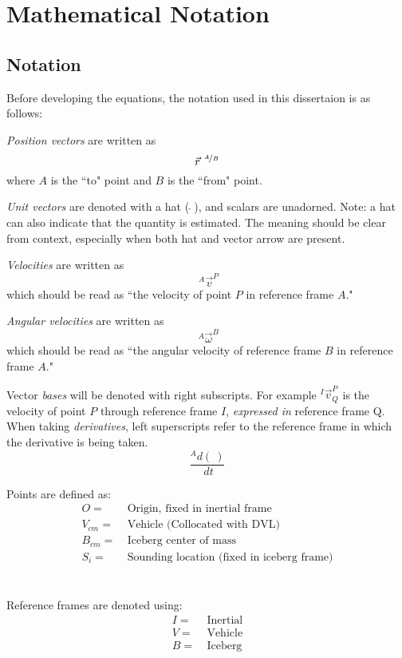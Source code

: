 
\chapter{Mathematical Notation}
\label{ch.Notation}
\section{Notation}

Before developing the equations, the notation used in this dissertaion is as follows:

\emph{Position vectors} are written as
\begin{equation*}
 \vec{r}^{~\nicefrac{A}{B}} 
\end{equation*}
where $A$ is the ``to" point and $B$ is the ``from" point.

\emph{Unit vectors} are denoted with a hat ($~\hat{}~$), and scalars are unadorned. Note: a hat can also indicate that the quantity is estimated. The meaning should be clear from context, especially when both hat and vector arrow are present.

\emph{Velocities} are written as 
\begin{equation*} 
~^{A}\vec{v}^{P} 
\end{equation*}
which should be read as ``the velocity of point $P$ in reference frame $A$."

\emph{Angular velocities} are written as 
\begin{equation*}
 ~^{A}\vec{\omega}^{B}
\end{equation*}
which should be read as ``the angular velocity of reference frame $B$ in reference frame $A$."

Vector \emph{bases} will be denoted with right subscripts. For example $^I\vec{v}^P_{Q}$ is the velocity of point $P$ through reference frame $I$, \emph{expressed in} reference frame Q.   
When taking \emph{derivatives}, left superscripts refer to the reference frame in which the derivative is being taken.
\begin{equation*}
 \frac{^{A}d(~)}{~dt}
\end{equation*}

Points are defined as:
\begin{align*}
O =&~ \text{Origin, fixed in inertial frame}\\
V_{cm} =&~ \text{Vehicle (Collocated with DVL)} \\
B_{cm} =&~ \text{Iceberg center of mass}\\
S_i =&~ \text{Sounding location (fixed in iceberg frame)}
\end{align*}
\\
\\
Reference frames are denoted using:
\begin{align*}
I =&~ \text{Inertial}\\
V =&~ \text{Vehicle} \\
B =&~ \text{Iceberg}
\end{align*}

